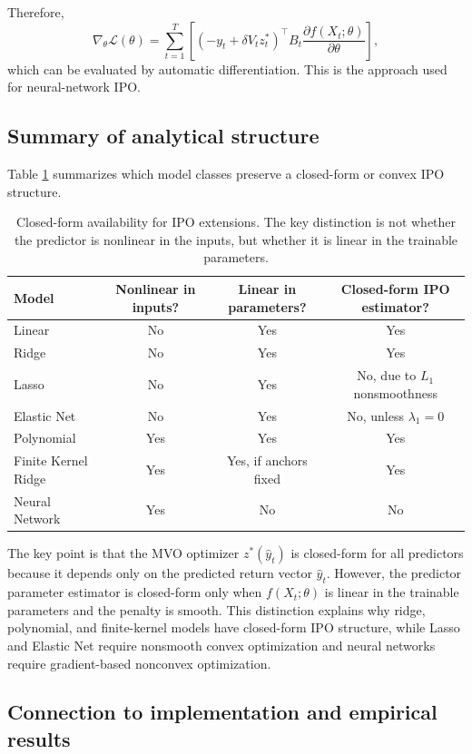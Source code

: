 \documentclass{article}
\begin{document}
Therefore,
\[
\nabla_{\theta}\mathcal L(\theta)
=
\sum_{t=1}^T
\left[
\left(
-y_t+\delta V_t z_t^*
\right)^\top
B_t
\frac{\partial f(X_t;\theta)}{\partial \theta}
\right],
\]
which can be evaluated by automatic differentiation. This is the approach used
for neural-network IPO.

\subsection{Summary of analytical structure}

Table \ref{tab:closed-form-summary} summarizes which model classes preserve a
closed-form or convex IPO structure.

\begin{table}[h]
\centering
\begin{tabular}{lccc}
\toprule
Model & Nonlinear in inputs? & Linear in parameters? & Closed-form IPO estimator? \\
\midrule
Linear & No & Yes & Yes \\
Ridge & No & Yes & Yes \\
Lasso & No & Yes & No, due to \(L_1\) nonsmoothness \\
Elastic Net & No & Yes & No, unless \(\lambda_1=0\) \\
Polynomial & Yes & Yes & Yes \\
Finite Kernel Ridge & Yes & Yes, if anchors fixed & Yes \\
Neural Network & Yes & No & No \\
\bottomrule
\end{tabular}
\caption{Closed-form availability for IPO extensions. The key distinction is
not whether the predictor is nonlinear in the inputs, but whether it is linear
in the trainable parameters.}
\label{tab:closed-form-summary}
\end{table}

The key point is that the MVO optimizer \(z^*(\hat y_t)\) is closed-form for
all predictors because it depends only on the predicted return vector
\(\hat y_t\). However, the predictor parameter estimator is closed-form only
when \(f(X_t;\theta)\) is linear in the trainable parameters and the penalty is
smooth. This distinction explains why ridge, polynomial, and finite-kernel
models have closed-form IPO structure, while Lasso and Elastic Net require
nonsmooth convex optimization and neural networks require gradient-based
nonconvex optimization.

\subsection{Connection to implementation and empirical results}
\end{document}
